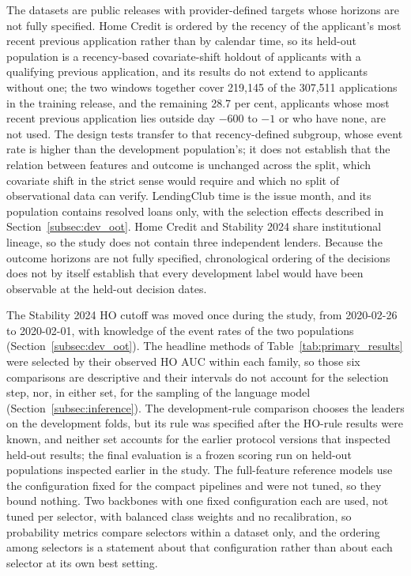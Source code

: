 \documentclass[final,5p,twocolumn]{elsarticle}
\begin{document}
The datasets are public releases with provider-defined targets whose horizons are not fully specified. Home Credit is ordered by the recency of the applicant's most recent previous application rather than by calendar time, so its held-out population is a recency-based covariate-shift holdout of applicants with a qualifying previous application, and its results do not extend to applicants without one; the two windows together cover 219,145 of the 307,511 applications in the training release, and the remaining 28.7 per cent, applicants whose most recent previous application lies outside day $-600$ to $-1$ or who have none, are not used. The design tests transfer to that recency-defined subgroup, whose event rate is higher than the development population's; it does not establish that the relation between features and outcome is unchanged across the split, which covariate shift in the strict sense would require and which no split of observational data can verify. LendingClub time is the issue month, and its population contains resolved loans only, with the selection effects described in Section~\ref{subsec:dev_oot}. Home Credit and Stability 2024 share institutional lineage, so the study does not contain three independent lenders. Because the outcome horizons are not fully specified, chronological ordering of the decisions does not by itself establish that every development label would have been observable at the held-out decision dates.

The Stability 2024 HO cutoff was moved once during the study, from 2020-02-26 to 2020-02-01, with knowledge of the event rates of the two populations (Section~\ref{subsec:dev_oot}). The headline methods of Table~\ref{tab:primary_results} were selected by their observed HO AUC within each family, so those six comparisons are descriptive and their intervals do not account for the selection step, nor, in either set, for the sampling of the language model (Section~\ref{subsec:inference}). The development-rule comparison chooses the leaders on the development folds, but its rule was specified after the HO-rule results were known, and neither set accounts for the earlier protocol versions that inspected held-out results; the final evaluation is a frozen scoring run on held-out populations inspected earlier in the study. The full-feature reference models use the configuration fixed for the compact pipelines and were not tuned, so they bound nothing. Two backbones with one fixed configuration each are used, not tuned per selector, with balanced class weights and no recalibration, so probability metrics compare selectors within a dataset only, and the ordering among selectors is a statement about that configuration rather than about each selector at its own best setting.
\end{document}
